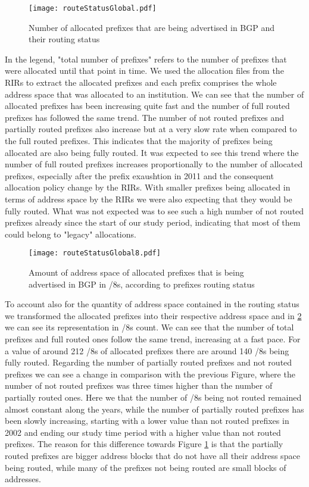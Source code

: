 \documentclass[11pt,a4paper]{scrreprt}
\begin{document}
\begin{figure}[!h]
\centering
\texttt{[image: routeStatusGlobal.pdf]}
\caption{Number of allocated prefixes that are being advertised in BGP and their routing status}
\label{fig:routingStatusGlobal}
\end{figure}

In the legend, "total number of prefixes" refers to the number of prefixes that were allocated until that point in time. We used the allocation files from the RIRs to extract the allocated prefixes and each prefix comprises the whole address space that was allocated to an institution. 
We can see that the number of allocated prefixes has been increasing quite fast and the number of full routed prefixes has followed the same trend. The number of not routed prefixes and partially routed prefixes also increase but at a very slow rate when compared to the full routed prefixes. This indicates that the majority of prefixes being allocated are also being fully routed. It was expected to see this trend where the number of full routed prefixes increases proportionally to the number of allocated prefixes, especially after the prefix exaushtion in 2011 and the consequent allocation policy change by the RIRs. With smaller prefixes being allocated in terms of address space by the RIRs we were also expecting that they would be fully routed. What was not expected was to see such a high number of not routed prefixes already since the start of our study period, indicating that most of them could belong to "legacy" allocations. 

\begin{figure}[!h]
\centering
\texttt{[image: routeStatusGlobal8.pdf]}
\caption{Amount of address space of allocated prefixes that is being advertised in BGP in /8s, according to prefixes routing status}
\label{fig:routingStatusGlobal8}
\end{figure}

To account also for the quantity of address space contained in the routing status we transformed the allocated prefixes into their respective address space and in \ref{fig:routingStatusGlobal8} we can see its representation in /8s count.
We can see that the number of total prefixes and full routed ones follow the same trend, increasing at a fast pace. For a value of around 212 /8s of allocated prefixes there are around 140 /8s being fully routed. 
Regarding the number of partially routed prefixes and not routed prefixes we can see a change in comparison with the previous Figure, where the number of not routed prefixes was three times higher than the number of partially routed ones. Here we that the number of /8s being not routed remained almost constant along the years, while the number of partially routed prefixes has been slowly increasing, starting with a lower value than not routed prefixes in 2002 and ending our study time period with a higher value than not routed prefixes. The reason for this difference towards Figure \ref{fig:routingStatusGlobal} is that the partially routed prefixes are bigger address blocks that do not have all their address space being routed, while many of the prefixes not being routed are small blocks of addresses. 
\end{document}
